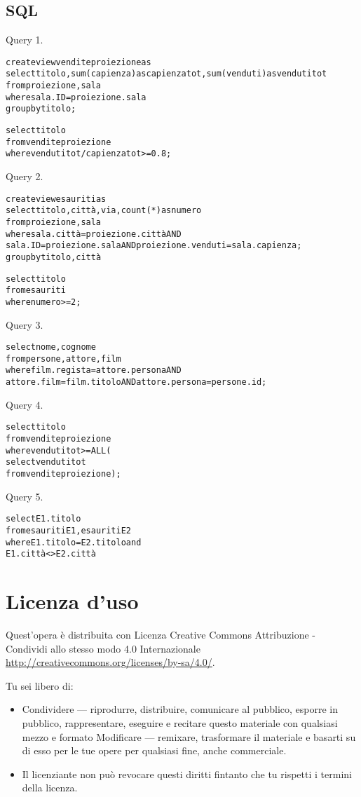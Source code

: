 \documentclass[11pt]{article}
\begin{document}
\subsection{SQL}

Query 1.
\begin{alltt}
create view venditeproiezione as
  select titolo, sum(capienza) as capienzatot, sum(venduti) as vendutitot
  from proiezione, sala
  where sala.ID=proiezione.sala
  group by titolo;

select titolo
from venditeproiezione
where vendutitot/capienzatot>=0.8;
\end{alltt}

Query 2.
\begin{alltt}
create view esauriti as
  select titolo, citt\`a, via, count(*) as numero
  from proiezione, sala
  where sala.citt\`a=proiezione.citt\`a AND
      sala.ID=proiezione.sala AND proiezione.venduti=sala.capienza;
  group by titolo, citt\`a

select titolo
from esauriti
where numero>=2;
\end{alltt}

Query 3.
\begin{alltt}
select nome, cognome
from persone, attore, film
where film.regista=attore.persona AND
    attore.film=film.titolo AND attore.persona=persone.id;
\end{alltt}

Query 4.
\begin{alltt}

select titolo
from venditeproiezione
where vendutitot >= ALL (
select vendutitot
from venditeproiezione);
\end{alltt}


Query 5.
\begin{alltt}

select E1.titolo
from esauriti E1, esauriti E2
where E1.titolo=E2.titolo and
      E1.citt\`a <> E2.citt\`a
\end{alltt}

\section*{Licenza d'uso}

Quest'opera è distribuita con Licenza Creative Commons
Attribuzione - Condividi allo stesso modo 4.0 Internazionale
\url{http://creativecommons.org/licenses/by-sa/4.0/}.


Tu sei libero di:
\begin{itemize}
\item
Condividere — riprodurre, distribuire, comunicare al pubblico, esporre in pubblico, rappresentare, eseguire e recitare questo materiale con qualsiasi mezzo e formato Modificare — remixare, trasformare il materiale e basarti su di esso per le tue opere per qualsiasi fine, anche commerciale.
\item
Il licenziante non può revocare questi diritti fintanto che tu rispetti i termini della licenza.
\end{itemize}
\end{document}
